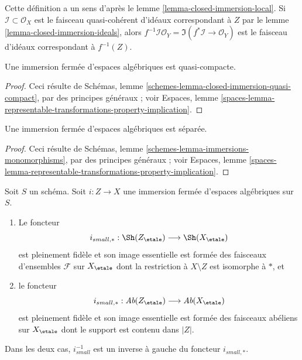 \noindent
Cette définition a un sens d'après le lemme \ref{lemma-closed-immersion-local}.
Si $\mathcal{I} \subset \mathcal{O}_X$ est le faisceau quasi-cohérent
d'idéaux correspondant à $Z$ par le lemme \ref{lemma-closed-immersion-ideals}, alors
$f^{-1}\mathcal{I}\mathcal{O}_Y = \Im(f^*\mathcal{I} \to \mathcal{O}_Y)$
est le faisceau d'idéaux correspondant à $f^{-1}(Z)$.

\begin{lemma}
\label{lemma-closed-immersion-quasi-compact}
Une immersion fermée d'espaces algébriques est quasi-compacte.
\end{lemma}

\begin{proof}
Ceci résulte de
Schémas, lemme \ref{schemes-lemma-closed-immersion-quasi-compact},
par des principes généraux ; voir
Espaces, lemme
\ref{spaces-lemma-representable-transformations-property-implication}.
\end{proof}

\begin{lemma}
\label{lemma-closed-immersion-separated}
Une immersion fermée d'espaces algébriques est séparée.
\end{lemma}

\begin{proof}
Ceci résulte de
Schémas, lemme \ref{schemes-lemma-immersions-monomorphisms},
par des principes généraux ; voir
Espaces, lemme
\ref{spaces-lemma-representable-transformations-property-implication}.
\end{proof}

\begin{lemma}
\label{lemma-closed-immersion-push-pull}
Soit $S$ un schéma. Soit $i : Z \to X$ une immersion fermée d'espaces
algébriques sur $S$.
\begin{enumerate}
\item Le foncteur
$$
i_{small, *} :
\Sh(Z_\etale)
\longrightarrow
\Sh(X_\etale)
$$
est pleinement fidèle et son image essentielle est formée des faisceaux d'ensembles
$\mathcal{F}$ sur $X_\etale$ dont la restriction à $X \setminus Z$ est
isomorphe à $*$, et
\item le foncteur
$$
i_{small, *} :
\textit{Ab}(Z_\etale)
\longrightarrow
\textit{Ab}(X_\etale)
$$
est pleinement fidèle et son image essentielle est formée des faisceaux abéliens sur
$X_\etale$ dont le support est contenu dans $|Z|$.
\end{enumerate}
Dans les deux cas, $i_{small}^{-1}$ est un inverse à gauche du foncteur
$i_{small, *}$.
\end{lemma}

